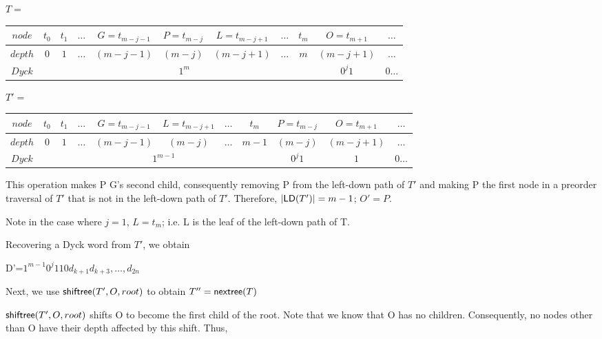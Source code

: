 \begin{enumerate}
\begin{itemize}
		\bigskip
		\bigskip

		$T=$
		\begin{center}
		\begin{tabular}{ |c|c|c|c|c|c|c|c|c|c|c| } 
		 \hline

		    $node$ & $t_0$ & $t_1$ & $\dots$ & $G=t_{m-j-1}$ & $P=t_{m-j}$ & $L=t_{m-j+1}$ & $\dots$ & $t_m$ & $O=t_{m+1}$ & $\dots$ \\
		 \hline
		 $depth$ & $0$ & $1$ & $\dots$ & $(m-j-1)$ & $(m-j)$ & $(m-j+1)$ & $\dots$ & $m$  & $(m-j+1)$ & $\dots$\\
		 \hline
		    $Dyck$ &  &  \multicolumn{7}{|c|}{$1^m$} &  $0^{j}1$   & $0\dots$\\
		 \hline
		\end{tabular}
		\end{center}


		\bigskip
		\bigskip


		$T'=$
		\begin{center}
		\begin{tabular}{ |c|c|c|c|c|c|c|c|c|c|c| } 
		 \hline

		    $node$ & $t_0$ & $t_1$ & $\dots$ & $G=t_{m-j-1}$ & $L=t_{m-j+1}$ & $\dots$ & $t_m$ & $P=t_{m-j}$ & $O=t_{m+1}$ & $\dots$ \\
		 \hline
		 $depth$ & $0$ & $1$ & $\dots$ & $(m-j-1)$ & $(m-j)$ & $\dots$ & $m-1$ & $(m-j)$  & $(m-j+1)$ & $\dots$\\
		 \hline
		    $Dyck$ &  &  \multicolumn{6}{|c|}{$1^{m-1}$} &  $0^{j}1$   & $1$ & $0\dots$\\
		 \hline
		\end{tabular}
		\end{center}

		This operation makes P G's second child, consequently removing P from the left-down path of $T'$ and making P the first node in a preorder traversal of $T'$ that is not in the left-down path of $T'$.  Therefore, $|\mathsf{LD}{(T')}|=m-1$; $O'=P$. 

		Note in the case where $j=1$, $L=t_m$; i.e. L is the leaf of the left-down path of T.

		Recovering a Dyck word from $T'$, we obtain 

		D'=$1^{m-1}0^j110d_{k+1}d_{k+3},\dots,d_{2n}$


		Next, we use $\mathsf{shiftree(} T', O, root \mathsf{)}$ to obtain $T'' = \mathsf{nextree}{(T)}$

$\mathsf{shiftree(} T', O, root \mathsf{)}$ shifts O to become the first child of the root. Note that we know that O has no children. Consequently, no nodes other than O have their depth affected by this shift. Thus, 


\end{itemize}
\end{enumerate}
